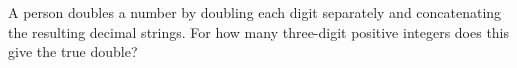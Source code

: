A person doubles a number by doubling each digit separately and concatenating the resulting decimal strings. For how many three-digit positive integers does this give the true double?
